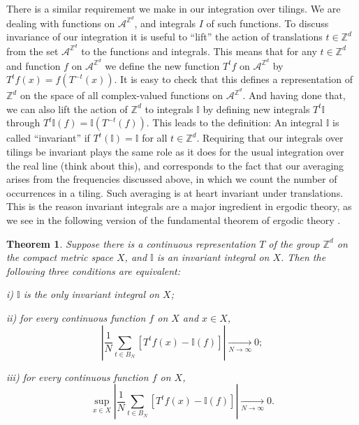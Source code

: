 \documentclass[reqno]{stml-l}
\theoremstyle{plain}
\newtheorem{theorem}{Theorem}[chapter]
\theoremstyle{definition}
\numberwithin{equation}{chapter}
\begin{document}
There is a similar requirement we make in our integration
over tilings. We are dealing with functions on
$\mathcal{A}^{\mathbb{Z}^{d}}$, and integrals $I$ of such
functions. To discuss invariance of our integration it is
useful to ``lift'' the action of translations $t\in
\mathbb{Z}^{d}$ from the set $\mathcal{A}^{\mathbb{Z}^{d}}$
to the functions and integrals. This means that for any
$t\in \mathbb{Z}^{d}$ and function $f$ on
$\mathcal{A}^{\mathbb{Z}^{d}}$ we define the new function
$T^{t}f$ on
$\mathcal{A}^{\mathbb{Z}^{d}}$ by $T^{t}f(x)=f(T^{-t}(x))$.
It is easy to check that this defines a representation of
$\mathbb{Z}^{d}$ on the space of all complex-valued
functions on $\mathcal{A}^{\mathbb{Z}^{d}}$. And having
done that, we can also lift the action of $\mathbb{Z}^{d}$
to integrals $\mathbb{I}$ by defining new integrals $T^{t}
\mathbb{I}$ through
$T^{t} \mathbb{I}(f)=
\mathbb{I}(T^{-t}(f))$.
This leads to the definition: An integral $\mathbb{I}$ is
called ``invariant'' if $T^{t}(\mathbb{I})=\mathbb{I}$ for
all $t\in \mathbb{Z}^{d}$. Requiring that our integrals
over tilings be invariant plays the same role as it does
for the usual integration over the real line (think about
this), and corresponds to the fact that our averaging
arises from the frequencies discussed above, in which we
count the number of occurrences in a tiling. Such averaging
is at heart invariant under translations. This is the
reason invariant integrals are a major ingredient in
ergodic theory, as we see in the following version of the
fundamental theorem of ergodic theory \cite[p.
160]{bib:Wal}.

\begin{theorem}\label{ch01:thm1.2}
Suppose there is a continuous representation $T$ of the
group $\mathbb{Z}^{d}$ on the compact metric space $X$, and
$\mathbb{I}$ is an invariant integral on $X$. Then the
following three conditions are equivalent:


i) $\mathbb{I}$ is the only invariant integral on $X$;

ii) for every continuous function $f$ on $X$ and $x\in X$,
\begin{equation}
|\frac{1}{N}\sum\limits_{t\in B_{N}}[T^{t}f(x)-\mathbb{I}(f)]|\underset{N\rightarrow\infty}{\longrightarrow}0;\label{ch01:eqn1.7}
\end{equation}

iii) for every continuous function $f$ on $X$,
\begin{equation}
\sup\limits_{x\in X}|\frac{1}{N}\sum\limits_{t\in B_{N}}[T^{t}f(x)-\mathbb{I}(f)]|\underset{N\rightarrow\infty}{\longrightarrow}0.\label{ch01:eqn:1.8}
\end{equation}
\end{theorem}
\end{document}
